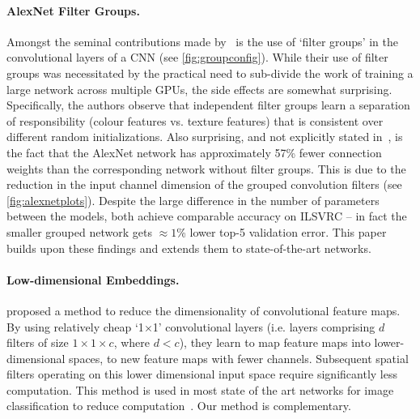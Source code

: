 \documentclass[thesis]{subfiles}
\begin{document}
	\paragraph{AlexNet Filter Groups.} Amongst the seminal contributions made by \citet{Krizhevsky2012}~is the use of `filter groups' in the convolutional layers of a CNN (see \cref{fig:groupconfig}). While their use of filter groups was necessitated by the practical need to sub-divide the work of training a large network across multiple GPUs, the side effects are somewhat surprising. Specifically, the authors observe that independent filter groups learn a separation of responsibility (colour features vs. texture features) that is consistent over different random initializations. Also surprising, and not explicitly stated in~\citep{Krizhevsky2012}, is the fact that the AlexNet network has approximately 57\% fewer connection weights than the corresponding network without filter groups. This is due to the reduction in the input channel dimension of the grouped convolution filters (see \cref{fig:alexnetplots}).
	Despite the large difference in the number of parameters between the models, both achieve comparable accuracy on ILSVRC -- in fact the smaller grouped network gets $\approx1$\% lower top-5 validation error. This paper builds upon these findings and extends them to state-of-the-art networks.
	
	\paragraph{Low-dimensional Embeddings.}
	\citet{Lin2013NiN} proposed a method to reduce the dimensionality of convolutional feature maps. 
	By using relatively cheap `1$\times$1' convolutional layers (i.e. layers comprising $d$ filters of size $1\times 1 \times c$, where $d<c$), they learn to map feature maps into lower-dimensional spaces, \ie to new feature maps with fewer channels. Subsequent spatial filters operating on this lower dimensional input space require significantly less computation. This method is used in most state of the art networks for image classification to reduce computation~\citep{Szegedy2014going,He2015}. Our method is complementary.
	
\end{document}
